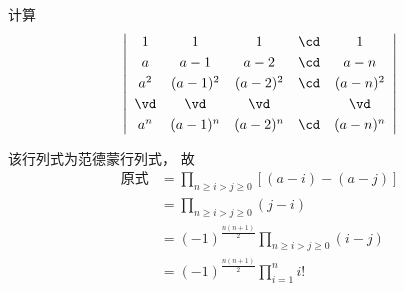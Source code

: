 \begin{frame}

\begin{testexample}
  计算
  $$
  \left|
    \begin{array}{ccccc}
      1&1&1&\cd&1\\[0.1cm]
      a&a-1&a-2&\cd&a-n\\[0.1cm]
      a^2&(a-1)^2&(a-2)^2&\cd&(a-n)^2\\[0.1cm]
      \vd&\vd&\vd&&\vd\\[0.1cm]
      a^n&(a-1)^n&(a-2)^n&\cd&(a-n)^n      
    \end{array}
  \right|
  $$      
\end{testexample}\pause

\begin{jie}
该行列式为范德蒙行列式， 故
$$
\begin{array}{rl}
  \mbox{原式} & = \prod_{n\ge i > j \ge 0} [(a-i)-(a-j)] \\[0.4cm]
              &= \prod_{n\ge i > j \ge 0} (j-i) \\[0.4cm]
              & = (-1)^{\frac{n(n+1)}2} \prod_{n\ge i > j \ge 0} (i-j) \\[0.4cm]
              & = (-1)^{\frac{n(n+1)}2} \prod_{i=1}^n i!      
\end{array}
$$
\end{jie}
\end{frame}

